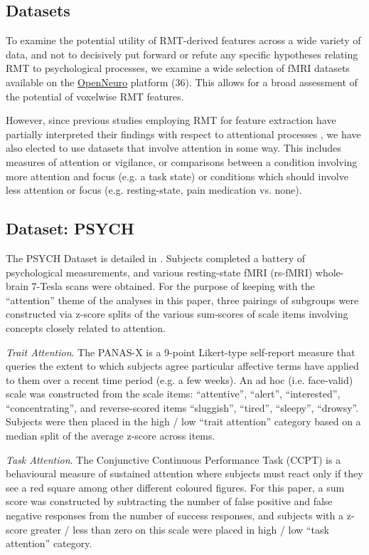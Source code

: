 \documentclass[12pt]{spieman}  %
\begin{document}
\begin{spacing}{2}
\section{Datasets}

To examine the potential utility of RMT-derived features across a wide
variety of data, and not to decisively put forward or refute any specific hypotheses relating RMT to
psychological processes, we examine a wide selection of fMRI datasets available on the
\href{https://openneuro.org/}{OpenNeuro} platform (36).  This allows for a broad assessment of the
potential of voxelwise RMT features.

However, since previous studies employing RMT for feature extraction have partially interpreted
their findings with respect to attentional processes
\cite{wangRandomMatrixTheory2016,matharooSpontaneousBackpainAlters2020}, we have also elected to use
datasets that involve attention in some way. This includes measures of attention or vigilance, or
comparisons between a condition involving more attention and focus (e.g. a task state) or conditions
which should involve less attention or focus (e.g. resting-state, pain medication vs. none).

\subsection{Dataset: PSYCH}
The PSYCH Dataset  is detailed in \cite{gorgolewskiHighResolution7Tesla2015}. Subjects completed a
battery of psychological measurements, and various resting-state fMRI (rs-fMRI) whole-brain 7-Tesla
scans were obtained. For the purpose of keeping with the ``attention'' theme of the analyses in this
paper, three pairings of subgroups were constructed via z-score splits of the various sum-scores of
scale items involving concepts closely related to attention.

\emph{Trait Attention}.
The PANAS-X \cite{watsonPANASXManualPositive1994} is a 9-point Likert-type self-report measure that
queries the extent to which subjects agree particular affective terms have applied to them over a
recent time period (e.g. a few weeks). An ad hoc (i.e. face-valid) scale was constructed from the
scale items: ``attentive'', ``alert'', ``interested'', ``concentrating'', and reverse-scored items
``sluggish'', ``tired'', ``sleepy'', ``drowsy''. Subjects were then placed in the high / low ``trait
attention'' category based on a median split of the average z-score across items.

\emph{Task Attention}.
The Conjunctive Continuous Performance Task \cite{shalevConjunctiveContinuousPerformance2011} (CCPT)
 is a behavioural measure of sustained attention
where subjects must react only if they see a red square among other different coloured figures. For
this paper, a sum score was constructed by subtracting the number of false positive and false
negative responses from the number of success responses, and subjects with a z-score greater / less
than zero on this scale were placed in high / low ``task attention'' category.


\end{spacing}
\end{document}

